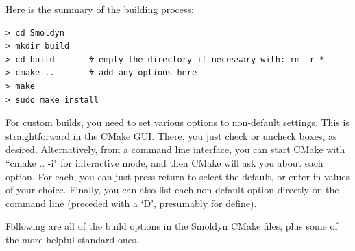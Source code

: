 \documentclass {scrbook}
\begin{document}
Here is the summary of the building process:

\begin{lstlisting}
> cd Smoldyn
> mkdir build
> cd build       # empty the directory if necessary with: rm -r *
> cmake ..	     # add any options here
> make
> sudo make install
\end{lstlisting}

For custom builds, you need to set various options to non-default settings. This is straightforward in the CMake GUI. There, you just check or uncheck boxes, as desired. Alternatively, from a command line interface, you can start CMake with ``cmake .. -i" for interactive mode, and then CMake will ask you about each option. For each, you can just press return to select the default, or enter in values of your choice. Finally, you can also list each non-default option directly on the command line (preceded with a `D', presumably for define).

Following are all of the build options in the Smoldyn CMake files, plus some of the more helpful standard ones.
\end{document}

